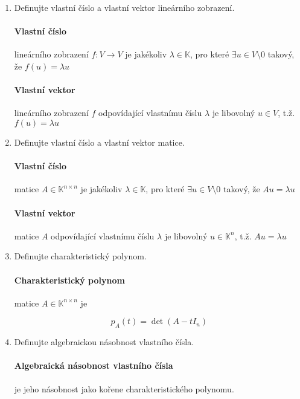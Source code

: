 \documentclass[10pt,a4paper]{article}
\theoremstyle{plain}
\theoremstyle{definition}
\begin{document}
\begin{enumerate}
\item Definujte vlastní číslo a vlastní vektor lineárního zobrazení.

\paragraph{Vlastní číslo} lineárního zobrazení $f: V \to V$ je jakékoliv $\lambda \in \mathbb{K}$, pro které $\exists u \in V \setminus 0$ takový, že $f(u) = \lambda u$

\paragraph{Vlastní vektor} lineárního zobrazení $f$ odpovídající vlastnímu číslu $\lambda$ je libovolný $u \in V$, t.ž. $f(u) = \lambda u$

\item Definujte vlastní číslo a vlastní vektor matice.

\paragraph{Vlastní číslo} matice $A \in \mathbb{K}^{n \times n}$ je jakékoliv $\lambda \in \mathbb{K}$, pro které $\exists u \in V \setminus 0$ takový, že $Au = \lambda u$

\paragraph{Vlastní vektor} matice $A$ odpovídající vlastnímu číslu $\lambda$ je libovolný $u \in \mathbb{K}^n$, t.ž. $Au = \lambda u$

\item Definujte charakteristický polynom.
 
\paragraph{Charakteristický polynom} matice $A \in \mathbb{K}^{n \times n}$ je

\[ p_A(t) = \det(A - tI_n)\]


\item Definujte algebraickou násobnost vlastního čísla.

\paragraph{Algebraická násobnost vlastního čísla} je jeho násobnost jako kořene charakteristického polynomu.


\end{enumerate}
\end{document}

